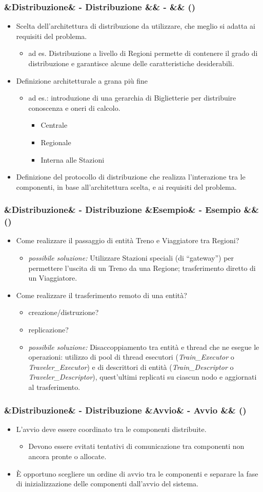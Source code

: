 \documentclass[slidestop,compress,blackandwhite]{beamer}
\newcommand{\ii}[1]{\textit{#1}}
\newcommand{\cm}[1]{\vspace{#1cm}}
\newcommand{\newtitle}[4]{
	#1 
	\ifx&#2&%
	\else
  		\large- #2
	\fi
	\ifx&#3&%
	\else
  		\normalsize- #3
	\fi
	\ifx&#4&%
	\else
  		\normalsize (#4)
	\fi
}
\newcommand{\newframe}[5]{
	\begin{frame}
		\frametitle{\newtitle{#1}{#2}{#3}{#4}}
		#5
	\end{frame}
}
\newcommand{\myitemize}[1]{
	\begin{itemize}\itemsep4pt
	#1
	\end{itemize}
}
\begin{document}
	\newframe{}{Distribuzione}{}{} {
		\myitemize {
			\item Scelta dell'architettura di distribuzione da utilizzare, che meglio si adatta ai requisiti del problema.
				\myitemize {
					\item ad es. Distribuzione a livello di Regioni permette di contenere il grado di distribuzione e garantisce alcune delle caratteristiche desiderabili.
				}
			
			\item Definizione architetturale a grana più fine
				\myitemize {
					\item ad es.: introduzione di una gerarchia di Biglietterie per distribuire conoscenza e oneri di calcolo.
						\myitemize {
							\item Centrale
							\item Regionale
							\item Interna alle Stazioni
						}
				}
			\item Definizione del protocollo di distribuzione che realizza l'interazione tra le componenti, in base all'architettura scelta, e ai requisiti del problema.
		}
	}

	\newframe{}{Distribuzione}{Esempio}{} {
		\myitemize {
			\item Come realizzare il passaggio di entità Treno e Viaggiatore tra Regioni?
				\myitemize {
					\item \ii{possibile soluzione:} Utilizzare Stazioni speciali (di ``gateway'') per permettere l'uscita di un Treno da una Regione; trasferimento diretto di un Viaggiatore.
				}
			\item Come realizzare il trasferimento remoto di una entità?
				\myitemize {
					\item creazione/distruzione?
					\item replicazione?
					\item \ii{possibile soluzione:} Disaccoppiamento tra entità e thread che ne esegue le operazioni: utilizzo di pool di thread esecutori (\ii{Train\_Executor} o \ii{Traveler\_Executor}) e di descrittori di entità (\ii{Train\_Descriptor} o \ii{Traveler\_Descriptor}), quest'ultimi replicati su ciascun nodo e aggiornati al trasferimento.
				}
		}
	}
	
	\newframe{}{Distribuzione}{Avvio}{}{
		\cm{0.5}
		\justifying
		\myitemize{
			\item L'avvio deve essere coordinato tra le componenti distribuite.
				\cm{0.3}
				\myitemize {
					\item Devono essere evitati tentativi di comunicazione tra componenti non ancora pronte o allocate.
				}
				\cm{0.3}
			\item \`E opportuno scegliere un ordine di avvio tra le componenti e separare la fase di inizializzazione delle componenti dall'avvio del sistema.
		}
		
	}
	
\end{document}
